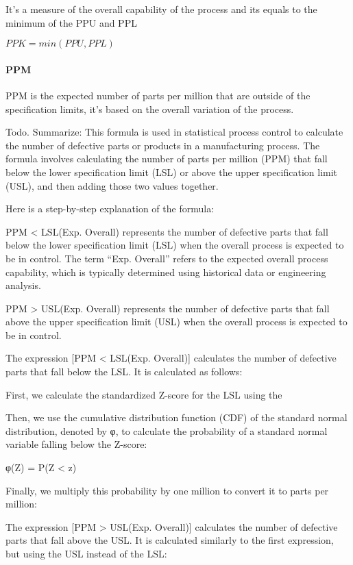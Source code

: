 \documentclass[11pt]{article}
\begin{document}
It's a measure of the overall capability of the process and its equals
to the minimum of the PPU and PPL

\(PPK = min(PPU, PPL)\)

\hypertarget{ppm}{%
\paragraph{PPM}\label{ppm}}

PPM is the expected number of parts per million that are outside of the
specification limits, it's based on the overall variation of the
process.



Todo. Summarize: This formula is used in statistical process control to
calculate the number of defective parts or products in a manufacturing
process. The formula involves calculating the number of parts per
million (PPM) that fall below the lower specification limit (LSL) or
above the upper specification limit (USL), and then adding those two
values together.

Here is a step-by-step explanation of the formula:

PPM \textless{} LSL(Exp. Overall) represents the number of defective
parts that fall below the lower specification limit (LSL) when the
overall process is expected to be in control. The term ``Exp. Overall''
refers to the expected overall process capability, which is typically
determined using historical data or engineering analysis.

PPM \textgreater{} USL(Exp. Overall) represents the number of defective
parts that fall above the upper specification limit (USL) when the
overall process is expected to be in control.

The expression {[}PPM \textless{} LSL(Exp. Overall){]} calculates the
number of defective parts that fall below the LSL. It is calculated as
follows:

First, we calculate the standardized Z-score for the LSL using the


Then, we use the cumulative distribution function (CDF) of the standard
normal distribution, denoted by φ, to calculate the probability of a
standard normal variable falling below the Z-score:

φ(Z) = P(Z \textless{} z)

Finally, we multiply this probability by one million to convert it to
parts per million:

The expression {[}PPM \textgreater{} USL(Exp. Overall){]} calculates the
number of defective parts that fall above the USL. It is calculated
similarly to the first expression, but using the USL instead of the LSL:
\end{document}
